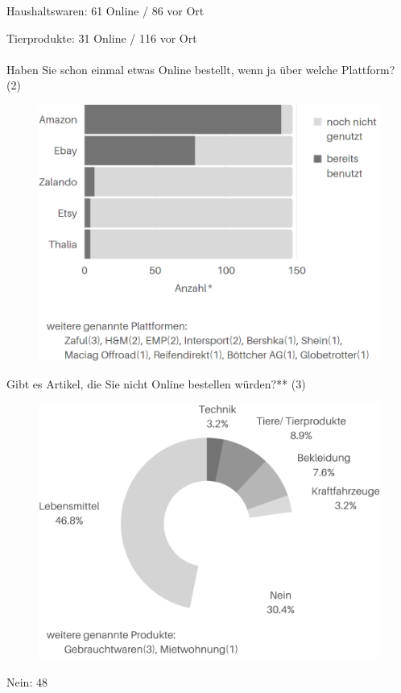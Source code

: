 Haushaltswaren: 61 Online / 86 vor Ort

Tierprodukte: 31 Online / 116 vor Ort\\\\
\fi 
\newpage\noindent Haben Sie schon einmal etwas Online bestellt, wenn ja über welche Plattform? (2)\\
\begin{figure}[H]
    \begin{center}
        \includegraphics[width=11.5cm]{media/schuelerumfrage/2.png} 
    \end{center}
\end{figure}

\noindent Gibt es Artikel, die Sie nicht Online bestellen würden?** (3)\\
\begin{figure}[H]
    \begin{center}
        \includegraphics[width=11.5cm]{media/schuelerumfrage/3.png}
    \end{center}
\end{figure}
\iffalse
Nein: 48

